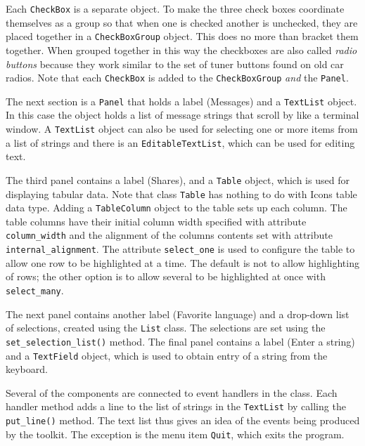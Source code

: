 Each \texttt{CheckBox} is a separate object. To make the three check
boxes coordinate themselves as a group so that when one is checked
another is unchecked, they are placed together in a
\texttt{CheckBoxGroup} object. This does no more than
{\textquotedbl}bracket{\textquotedbl} them together. When grouped
together in this way the checkboxes are also called \textit{radio buttons} because they work similar to the set of
tuner buttons found on old car radios. Note that each
\texttt{CheckBox} is added to the \texttt{CheckBoxGroup} \textit{and}
the \texttt{Panel}.

The next section is a \texttt{Panel} that holds a label
({\textquotedbl}Messages{\textquotedbl}) and a \texttt{TextList}
object. In this case the object holds a list of message
strings that scroll by like a terminal window. A \texttt{TextList}
object can also be used for selecting one or more items from a list of
strings and there is an \texttt{EditableTextList},
which can be used for editing text.

The third panel contains a label ({\textquotedbl}Shares{\textquotedbl}),
and a \texttt{Table} object, which is used for displaying tabular data.
Note that class \texttt{Table} has nothing to do with
Icon{\textquotesingle}s table data type. Adding a \texttt{TableColumn}
object to the table sets up each column. The table columns have their
initial column width specified with attribute \texttt{column\_width}
and the alignment of the column{\textquotesingle}s contents set with
attribute \texttt{internal\_alignment}. The attribute
\texttt{select\_one} is used to configure the table to allow one row to
be highlighted at a time. The default is not to allow highlighting of
rows; the other option is to allow several to be highlighted at once
with \texttt{select\_many}.

The next panel contains another label ({\textquotedbl}Favorite
language{\textquotedbl}) and a drop-down list of selections, created
using the \texttt{List} class. The selections are set using the
\texttt{set\_selection\_list()} method. The final panel contains a
label ({\textquotedbl}Enter a string{\textquotedbl}) and a
\texttt{TextField} object, which is used to obtain entry of a string
from the keyboard.

Several of the components are connected to event handlers in the class.
Each handler method adds a line to the list of strings in the
\texttt{TextList} by calling the \texttt{put\_line()} method. The text
list thus gives an idea of the events being produced by the toolkit.
The exception is the menu item \texttt{Quit}, which exits the
program.

